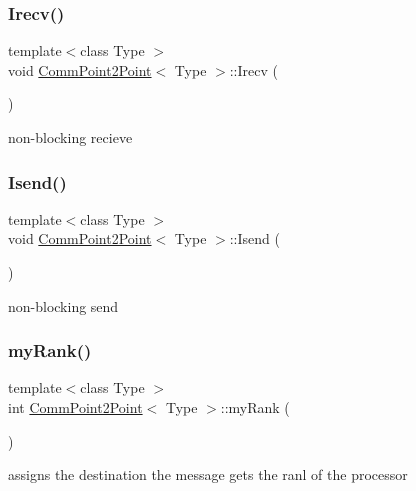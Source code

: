 \subsubsection{\texorpdfstring{Irecv()}{Irecv()}}
{\footnotesize\ttfamily template$<$class Type $>$ \\
void \mbox{\hyperlink{classCommPoint2Point}{Comm\+Point2\+Point}}$<$ Type $>$\+::Irecv (\begin{DoxyParamCaption}{ }\end{DoxyParamCaption})}

non-\/blocking recieve \mbox{\label{classCommPoint2Point_a6415fa1d951388ab158d441539337ed0}} 
\subsubsection{\texorpdfstring{Isend()}{Isend()}}
{\footnotesize\ttfamily template$<$class Type $>$ \\
void \mbox{\hyperlink{classCommPoint2Point}{Comm\+Point2\+Point}}$<$ Type $>$\+::Isend (\begin{DoxyParamCaption}{ }\end{DoxyParamCaption})}

non-\/blocking send \mbox{\label{classCommPoint2Point_aea7be5ce3b1dcd98c6d02c165be9867c}} 
\subsubsection{\texorpdfstring{my\+Rank()}{myRank()}}
{\footnotesize\ttfamily template$<$class Type $>$ \\
int \mbox{\hyperlink{classCommPoint2Point}{Comm\+Point2\+Point}}$<$ Type $>$\+::my\+Rank (\begin{DoxyParamCaption}{ }\end{DoxyParamCaption})}

assigns the destination the message gets the ranl of the processor \mbox{\label{classCommPoint2Point_a7b2195c888a452f25f1567fa1006459e}} 

